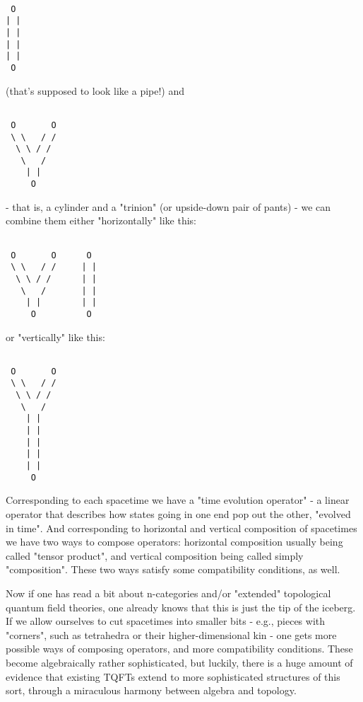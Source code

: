 \begin{verbatim}

 O
| |
| |
| |
| |
 O
\end{verbatim}
    

(that's supposed to look like a pipe!) and 


\begin{verbatim}

 O       O
 \ \   / /
  \ \ / /
   \   /
    | |
     O
\end{verbatim}
    

- that is, a cylinder and a "trinion" (or upside-down pair of pants) - 
we can combine them either "horizontally" like this:


\begin{verbatim}

 O       O      O
 \ \   / /     | |
  \ \ / /      | |
   \   /       | |
    | |        | | 
     O          O
\end{verbatim}
    

or "vertically" like this:


\begin{verbatim}

 O       O
 \ \   / /
  \ \ / /
   \   /
    | |
    | |
    | |
    | |
    | |
     O
\end{verbatim}
    

Corresponding to each spacetime we have a "time evolution operator" -
a linear operator that describes how states going in one end pop out the
other, "evolved in time".  And corresponding to horizontal and vertical 
composition of spacetimes we have two ways to compose operators: 
horizontal composition usually being called "tensor product", and 
vertical composition being called simply "composition".  These two ways 
satisfy some compatibility conditions, as well.

Now if one has read a bit about n-categories and/or "extended" topological
quantum field theories, one already knows that this is just the 
tip of the iceberg.  If we allow ourselves to cut spacetimes into 
smaller bits - e.g., pieces with "corners", such as tetrahedra or their 
higher-dimensional kin - one gets more
possible ways of composing operators, and more compatibility conditions.  These
become algebraically rather sophisticated, but luckily, there is a huge 
amount of evidence that existing TQFTs extend to more 
sophisticated structures of this sort, through a miraculous 
harmony between algebra and topology.  

